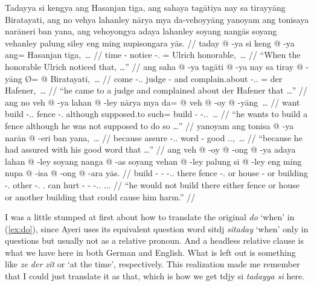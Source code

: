 \documentclass[12pt,paper=a4]{scrartcl}
\newcommand{\fw}[1]{\textit{#1}} %
\newcommand{\ayr}[1]{{\Tagati #1}}
\newcommand{\xayr}[3]{{\Tagati #1} \emph{#2} \enquote*{#3}}
\begin{document}

\pex
	\glpreamble Tadayya si kengya ang Hasanjan tiga, ang sahaya tagātiya
		nay sa tirayyāng Biratayati, ang no vehya lahanley nārya mya
		da-vehoyyāng yanoyam ang tonisaya narāneri ban yana, ang 
		vehoyongya adaya lahanley soyang nangās soyang vehanley palung 
		siley eng ming nupisongara yās. //
	\a \label{ex:do} \begingl
		\gla taday @ -ya si keng @ -ya ang= Hasanjan tiga,~… //
		\glb time -\Loc{} \Rel{} notice -\Tsg{}.\M{} \Aarg{}= Ulrich 
			honorable,~… //
		\glft \enquote{When the honorable Ulrich noticed that, …} //
	\endgl
	\a \begingl
		\gla ang saha @ -ya tagāti @ -ya nay sa tiray @ -yāng Ø= @ 
			{Biratayati},~… //
		\glb \AgtT{} come -\Tsg{}.\M{}.\Top{} judge -\Loc{} and \PatT{} 
			complain.about -\Tsg{}.\M{}.\Aarg{} \Top{}= {der 
			Hafener,}~… //
		\glft \enquote{he came to a judge and complained about der 
			Hafener that …} //
	\endgl
	\a \begingl
		\gla ang no veh @ -ya lahan @ -ley nārya mya da= @ veh @ -oy @ 
			-yāng~… //
		\glb \AgtT{} want build -\Tsg{}.\M{}.\Top{} fence 
			-\Parg{}.\Inan{} although supposed.to such= build 
			-\Neg{} -\Tsg{}.\M{}.\Aarg{}~… //
		\glft \enquote{he wants to build a fence although he was not 
			supposed to do so …} //
	\endgl
	\a \begingl
		\gla yanoyam ang tonisa @ -ya narān @ -eri ban yana,~… //
		\glb because \AgtT{} assure -\Tsg{}.\M{}.\Top{} word -\Ins{} 
			good \Tsg{}.\M{}.\Gen{},~… //
		\glft \enquote{because he had assured with his good word that 
			…} //
	\endgl
	\a \begingl
		\gla ang veh @ -oy @ -ong @ -ya adaya lahan @ -ley soyang nanga 
			@ -as soyang vehan @ -ley palung si @ -ley eng ming nupa 
			@ -isa @ -ong @ -ara yās. //
		\glb \AgtT{} build -\Neg{} -\Irr{} -\Tsg{}.\M{}.\Top{} there 
			fence -\Parg{}.\Inan{} or house -\Parg{} or building 
			-\Parg{}.\Inan{} other \Rel{} -\Parg{}.\Inan{} 
			\AgtT{}.\Inan{} can hurt -\Caus{} -\Irr{} 
			-\Tsg{}.\Inan{}.\Top{} \Tsg{}.\M{}.\Parg{}. //
		\glft \enquote{he would not build there either fence or house or 
			another building that could cause him harm.} //
	\endgl
\xe

I was a little stumped at first about how to translate the original \fw{do} 
`when' in (\ref{ex:do}), since Ayeri uses its equivalent question word 
\xayr{sitdj}{sitaday}{when} only in questions but usually not as a relative 
pronoun. And a headless relative clause is what we have here in both German and 
English. What is left out is something like \fw{ze der zît} or `at the time', 
respectively. This realization made me remember that I could just translate it 
as that, which is how we get \ayr{tdjy si} \fw{tadayya si} here.
\end{document}
